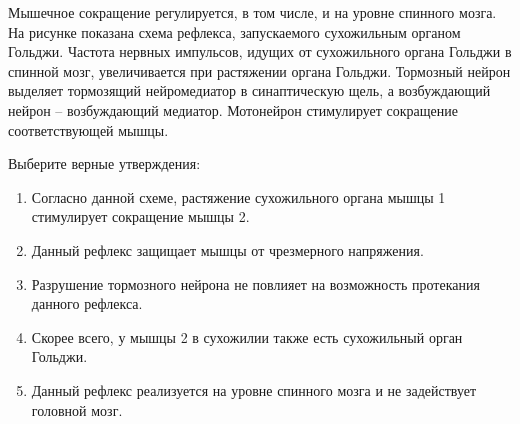 
Мышечное
сокращение регулируется, в том числе, и на уровне спинного мозга. На рисунке
показана схема рефлекса, запускаемого сухожильным органом Гольджи. Частота
нервных импульсов, идущих от сухожильного органа Гольджи в спинной мозг,
увеличивается при растяжении органа Гольджи. Тормозный нейрон выделяет
тормозящий нейромедиатор в синаптическую щель, а возбуждающий нейрон –
возбуждающий медиатор. Мотонейрон стимулирует сокращение соответствующей мышцы.


Выберите
верные утверждения:

\begin{enumerate}
    \item Согласно данной схеме, растяжение сухожильного органа мышцы 1 стимулирует сокращение мышцы 2.
    \item Данный рефлекс защищает мышцы от чрезмерного напряжения.
    \item Разрушение тормозного нейрона не повлияет на возможность протекания данного рефлекса.
    \item Скорее всего, у мышцы 2 в сухожилии также есть сухожильный орган Гольджи.
    \item Данный рефлекс реализуется на уровне спинного мозга и не задействует головной мозг.
\end{enumerate}



